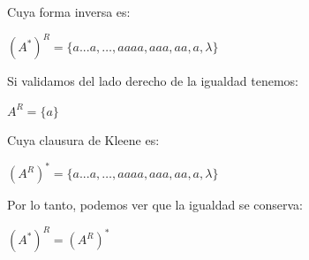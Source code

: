 \begin{enumerate}
        Cuya forma inversa es:
        \begin{center}
            $(A^*)^R = \{a...a,\ldots,aaaa,aaa,aa,a,\lambda\}$
        \end{center}
        
        Si validamos del lado derecho de la igualdad tenemos:
        \begin{center}
            $A^R = \{a\}$
        \end{center}
        
        Cuya clausura de Kleene es:
        \begin{center}
            $(A^R)^* = \{a...a,\ldots,aaaa,aaa,aa,a,\lambda\}$
        \end{center}
        
        Por lo tanto, podemos ver que la igualdad se conserva:
        \begin{center}
            $\boxed{(A^*)^R = (A^R)^*}$
        \end{center}
\end{enumerate}